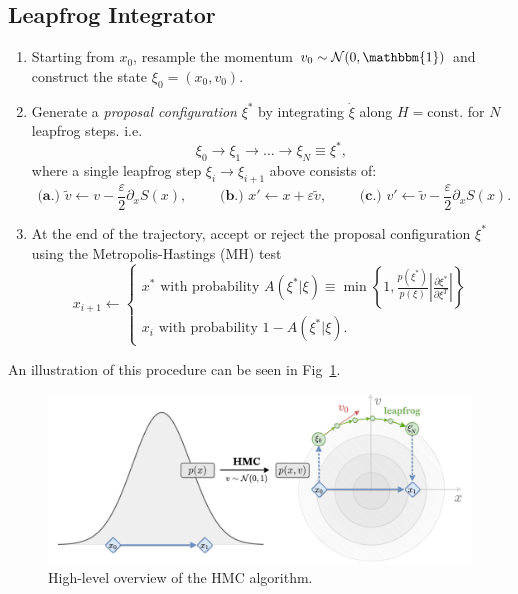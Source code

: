 \documentclass[a4paper,11pt]{article}
\newcommand{\acceptProb}{%
            A(\xi^{\ast}|\xi) \equiv \min\left\{1,
            \frac{p(\xi^{\ast})}{p(\xi)}%
        \left|\frac{\partial \xi^{\ast}}{\partial \xi^{T}}\right|\right\}
    }
\begin{document}
\subsection{\label{subsec:lfint}Leapfrog Integrator}
%
\begin{enumerate}
    \item Starting from \(x_{0}\), resample the momentum \(v_{0}\sim
        \mathcal{N} (0, \mathbbm{1})\) and construct the state \(\xi_{0} =
        (x_{0}, v_{0})\).
    \item Generate a \emph{proposal configuration} \(\xi^{\ast}\) by
        integrating \(\dot\xi\) along \(H = \mathrm{const.}\)
        for \(N\) leapfrog steps.
        i.e.
        \begin{equation}
            \xi_{0}\rightarrow \xi_{1}\rightarrow\ldots\rightarrow
            \xi_{N} \equiv \xi^{\ast},
        \end{equation}
        where a single leapfrog step \(\xi_{i} \rightarrow \xi_{i+1}\) above
        consists of: 
        \begin{equation}
            \textbf{ (a.) }%
              \tilde{v}\leftarrow v - \frac{\varepsilon}{2}\partial_{x} S(x),
            \quad\quad
            \textbf{ (b.) }%
              x' \leftarrow x + \varepsilon \tilde{v},
            \quad\quad
            \textbf{ (c.) }%
              v' \leftarrow \tilde{v} - \frac{\varepsilon}{2}\partial_{x} S(x).
        \end{equation}
    \item At the end of the trajectory, accept or reject the proposal
        configuration \(\xi^{\ast}\) using the Metropolis-Hastings (MH) test
        \begin{equation}
            x_{i+1} \leftarrow
            \begin{cases}
                x^{\ast}\text{ with probability } \acceptProb \\
                x_{i}\text{ with probability } 1 - A(\xi^{\ast}|\xi).
            \end{cases}
        \end{equation}
\end{enumerate}
%
An illustration of this procedure can be seen in Fig~\ref{fig:hmc}.
%
\begin{figure}[htpb]
    \centering
    \includegraphics[width=\textwidth]{assets/hmc.pdf}
    \caption{\label{fig:hmc}High-level overview of the HMC algorithm.}
\end{figure}
%
\end{document}
